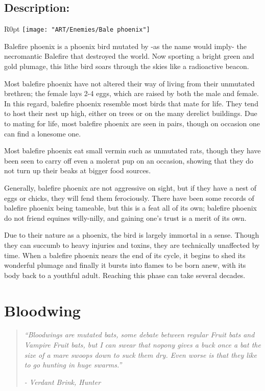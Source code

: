 \documentclass[11pt,a4paper,twocolumn]{book}
\begin{document}
	\subsection*{Description:}
	\begin{wrapfigure}{R}{0pt}
		\texttt{[image: "ART/Enemies/Bale phoenix"]}
	\end{wrapfigure}
	Balefire phoenix is a phoenix bird mutated by -as the name would imply- the necromantic Balefire that destroyed the world. Now sporting a bright green and gold plumage, this lithe bird soars through the skies like a radioactive beacon.
	
	Most balefire phoenix have not altered their way of living from their unmutated brethren; the female lays 2-4 eggs, which are raised by both the male and female. In this regard, balefire phoenix resemble most birds that mate for life. They tend to host their nest up high, either on trees or on the many derelict buildings. Due to mating for life, most balefire phoenix are seen in pairs, though on occasion one can find a lonesome one.
	
	Most balefire phoenix eat small vermin such as unmutated rats, though they have been seen to carry off even a molerat pup on an occasion, showing that they do not turn up their beaks at bigger food sources.
	
	Generally, balefire phoenix are not aggressive on sight, but if they have a nest of eggs or chicks, they will fend them ferociously. There have been some records of balefire phoenix being tameable, but this is a feat all of its own; balefire phoenix do not friend equines willy-nilly, and gaining one's trust is a merit of its own.
	
	Due to their nature as a phoenix, the bird is largely immortal in a sense. Though they can succumb to heavy injuries and toxins, they are technically unaffected by time. When a balefire phoenix nears the end of its cycle, it begins to shed its wonderful plumage and finally it bursts into flames to be born anew, with its body back to a youthful adult. Reaching this phase can take several decades.
	
	\clearpage
	
	\section*{Bloodwing}
	\begin{quote}
		\emph{``Bloodwings are mutated bats, some debate between regular Fruit bats and Vampire Fruit bats, but I can swear that nopony gives a buck once a bat the size of a mare swoops down to suck them dry. Even worse is that they like to go hunting in huge swarms.''}
		
		\emph{-	Verdant Brink, Hunter}
	\end{quote}
	
\end{document}
